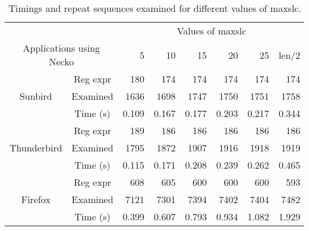 
{\normalsize
\begin{table*}[t]
\begin{center}
\small
   \begin{tabular}{|c|c|r|r|r|r|r|r|}
      \hline
      \multicolumn{2}{|c|}{} & \multicolumn{6}{|c|}{Values of maxslc} \\
      \cline{3-8}
      \multicolumn{2}{|c|}{Applications using Necko}
                             & {5} & {10}  & {15} & {20} & {25} & {len/2} \\
      \hline
      \hline
      {}     & {Reg expr}  & {180}      & {174}       & {174}       & {174}      & {174}      & {174} \\
      \cline{2-8}
      {Sunbird}            & {Examined}  & {1636}       & {1698}       & {1747}        & {1750}      & {1751}       & {1758} \\
      \cline{2-8}
      {}     & {Time (s)}  & {0.109}      & {0.167}       & {0.177}       & {0.203}      & {0.217}      & {0.344} \\
      \hline
      \hline
      {}     & {Reg expr}  & {189}      & {186}       & {186}       & {186}      & {186}      & {186} \\
      \cline{2-8}
      {Thunderbird}            & {Examined}  & {1795}       & {1872}       & {1907}        & {1916}      & {1918}       & {1919} \\
      \cline{2-8}
      {}       & {Time (s)}  & {0.115}      & {0.171}      & {0.208}       & {0.239}     & {0.262}      & {0.465} \\
      \hline
      \hline
      {}     & {Reg expr}  & {608}      & {605}       & {600}       & {600}      & {600}      & {593} \\
      \cline{2-8}
      {Firefox}            & {Examined}  & {7121}       & {7301}       & {7394}        & {7402}      & {7404}       & {7482} \\
      \cline{2-8}
      {}       & {Time (s)}  & {0.399}      & {0.607}      & {0.793}       & {0.934}     & {1.082}      & {1.929} \\
      \hline
   \end{tabular}
\end{center}
 \caption{Timings and repeat sequences examined for different values 
of maxslc.
}
\label{table:slicetimes}
\shortline
\end{table*}
}

